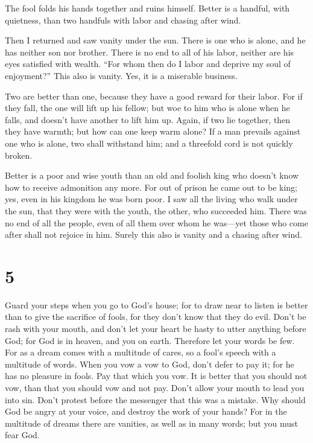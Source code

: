  The fool folds his hands together and ruins himself.
 Better is a handful, with quietness, than two handfuls
with labor and chasing after wind.

 Then I returned and saw vanity under the sun.
 There is one who is alone, and he has neither son nor
brother. There is no end to all of his labor, neither are his eyes
satisfied with wealth. ``For whom then do I labor and deprive my soul of
enjoyment?'' This also is vanity. Yes, it is a miserable business.

 Two are better than one, because they have a good reward
for their labor.  For if they fall, the one will lift up
his fellow; but woe to him who is alone when he falls, and doesn't have
another to lift him up.  Again, if two lie together, then
they have warmth; but how can one keep warm alone?  If a
man prevails against one who is alone, two shall withstand him; and a
threefold cord is not quickly broken.

 Better is a poor and wise youth than an old and foolish
king who doesn't know how to receive admonition any more.
 For out of prison he came out to be king; yes, even in
his kingdom he was born poor.  I saw all the living who
walk under the sun, that they were with the youth, the other, who
succeeded him.  There was no end of all the people, even
of all them over whom he was---yet those who come after shall not
rejoice in him. Surely this also is vanity and a chasing after wind.

\hypertarget{section-4}{%
\section{5}\label{section-4}}

 Guard your steps when you go to God's house; for to draw
near to listen is better than to give the sacrifice of fools, for they
don't know that they do evil.  Don't be rash with your
mouth, and don't let your heart be hasty to utter anything before God;
for God is in heaven, and you on earth. Therefore let your words be few.
 For as a dream comes with a multitude of cares, so a
fool's speech with a multitude of words.  When you vow a
vow to God, don't defer to pay it; for he has no pleasure in fools. Pay
that which you vow.  It is better that you should not vow,
than that you should vow and not pay.  Don't allow your
mouth to lead you into sin. Don't protest before the messenger that this
was a mistake. Why should God be angry at your voice, and destroy the
work of your hands?  For in the multitude of dreams there
are vanities, as well as in many words; but you must fear God.

